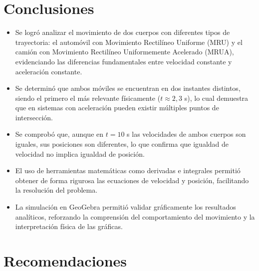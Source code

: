 \section{Conclusiones}

\begin{itemize}
    \item Se logró analizar el movimiento de dos cuerpos con diferentes tipos de trayectoria: el automóvil con Movimiento Rectilíneo Uniforme (MRU) y el camión con Movimiento Rectilíneo Uniformemente Acelerado (MRUA), evidenciando las diferencias fundamentales entre velocidad constante y aceleración constante.
    
    \item Se determinó que ambos móviles se encuentran en dos instantes distintos, siendo el primero el más relevante físicamente ($t \approx 2{,}3$ s), lo cual demuestra que en sistemas con aceleración pueden existir múltiples puntos de intersección.
    
    \item Se comprobó que, aunque en $t = 10$ s las velocidades de ambos cuerpos son iguales, sus posiciones son diferentes, lo que confirma que igualdad de velocidad no implica igualdad de posición.
    
    \item El uso de herramientas matemáticas como derivadas e integrales permitió obtener de forma rigurosa las ecuaciones de velocidad y posición, facilitando la resolución del problema.
    
    \item La simulación en GeoGebra permitió validar gráficamente los resultados analíticos, reforzando la comprensión del comportamiento del movimiento y la interpretación física de las gráficas.
\end{itemize}

\section{Recomendaciones}

